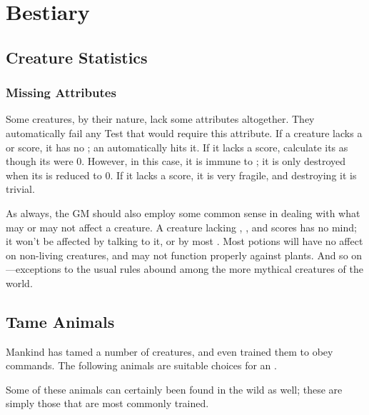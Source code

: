 \chapter{Bestiary}

\section{Creature Statistics}

\subsection{Missing Attributes}

Some creatures, by their nature, lack some attributes altogether.
They automatically fail any Test that would require this attribute.
If a creature lacks a  or  score, it has no ; an  automatically hits it.
If it lacks a  score, calculate its  as though its  were 0.
However, in this case, it is immune to {\shock}; it is only destroyed when its  is reduced to 0.
If it lacks a  score, it is very fragile, and destroying it is trivial.

As always, the GM should also employ some common sense in dealing with what may or may not affect a creature.
A creature lacking , , and  scores has no mind; it won't be affected by talking to it, or by most .
Most potions will have no affect on non-living creatures, and may not function properly against plants.
And so on---exceptions to the usual rules abound among the more mythical creatures of the world.

\section{Tame Animals}

Mankind has tamed a number of creatures, and even trained them to obey commands.
The following animals are suitable choices for an .

Some of these animals can certainly been found in the wild as well; these are simply those that are most commonly trained.



